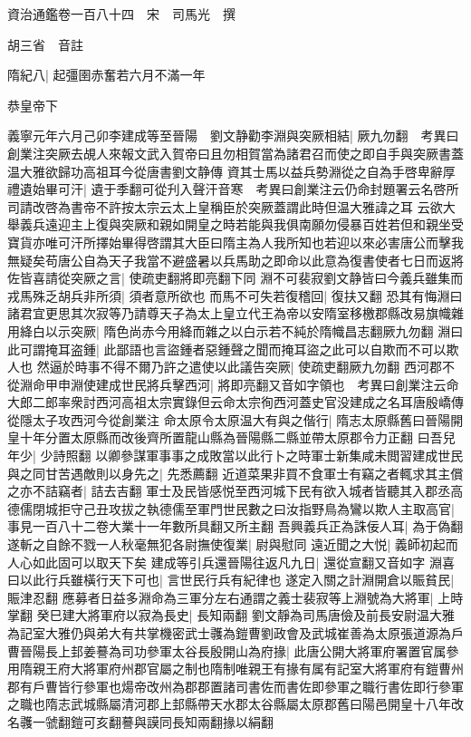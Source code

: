 資治通鑑卷一百八十四　宋　司馬光　撰

胡三省　音註

隋紀八|{
	起彊圉赤奮若六月不滿一年}


恭皇帝下

義寧元年六月己卯李建成等至晉陽　劉文静勸李淵與突厥相結|{
	厥九勿翻　考異曰創業注突厥去覘人來報文武入賀帝曰且勿相賀當為諸君召而使之即自手與突厥書蓋温大雅欲歸功高祖耳今從唐書劉文静傳}
資其士馬以益兵勢淵從之自為手啓卑辭厚禮遺始畢可汗|{
	遺于季翻可從刋入聲汗音寒　考異曰創業注云仍命封題署云名啓所司請改啓為書帝不許按太宗云太上皇稱臣於突厥蓋謂此時但温大雅諱之耳}
云欲大舉義兵遠迎主上復與突厥和親如開皇之時若能與我俱南願勿侵暴百姓若但和親坐受寶貨亦唯可汗所擇始畢得啓謂其大臣曰隋主為人我所知也若迎以來必害唐公而擊我無疑矣苟唐公自為天子我當不避盛暑以兵馬助之即命以此意為復書使者七日而返將佐皆喜請從突厥之言|{
	使疏吏翻將即亮翻下同}
淵不可裴寂劉文静皆曰今義兵雖集而戎馬殊乏胡兵非所須|{
	須者意所欲也}
而馬不可失若復稽回|{
	復扶又翻}
恐其有悔淵曰諸君宜更思其次寂等乃請尊天子為太上皇立代王為帝以安隋室移檄郡縣改易旗幟雜用絳白以示突厥|{
	隋色尚赤今用絳而雜之以白示若不純於隋幟昌志翻厥九勿翻}
淵曰此可謂掩耳盗鍾|{
	此鄙語也言盜鍾者惡鍾聲之聞而掩耳盜之此可以自欺而不可以欺人也}
然逼於時事不得不爾乃許之遣使以此議告突厥|{
	使疏吏翻厥九勿翻}
西河郡不從淵命甲申淵使建成世民將兵擊西河|{
	將即亮翻又音如字領也　考異曰創業注云命大郎二郎率衆討西河高祖太宗實錄但云命太宗徇西河蓋史官没建成之名耳唐殷嶠傳從隱太子攻西河今從創業注}
命太原令太原温大有與之偕行|{
	隋志太原縣舊曰晉陽開皇十年分置太原縣而改後齊所置龍山縣為晉陽縣二縣並帶太原郡令力正翻}
曰吾兒年少|{
	少詩照翻}
以卿參謀軍事事之成敗當以此行卜之時軍士新集咸未閲習建成世民與之同甘苦遇敵則以身先之|{
	先悉薦翻}
近道菜果非買不食軍士有竊之者輒求其主償之亦不詰竊者|{
	詰去吉翻}
軍士及民皆感悦至西河城下民有欲入城者皆聽其入郡丞高德儒閉城拒守己丑攻拔之執德儒至軍門世民數之曰汝指野鳥為鸞以欺人主取高官|{
	事見一百八十二卷大業十一年數所具翻又所主翻}
吾興義兵正為誅佞人耳|{
	為于偽翻}
遂斬之自餘不戮一人秋毫無犯各尉撫使復業|{
	尉與慰同}
遠近聞之大悦|{
	義師初起而人心如此固可以取天下矣}
建成等引兵還晉陽往返凡九日|{
	還從宣翻又音如字}
淵喜曰以此行兵雖橫行天下可也|{
	言世民行兵有紀律也}
遂定入關之計淵開倉以賑貧民|{
	賑津忍翻}
應募者日益多淵命為三軍分左右通謂之義士裴寂等上淵號為大將軍|{
	上時掌翻}
癸巳建大將軍府以寂為長史|{
	長知兩翻}
劉文靜為司馬唐儉及前長安尉温大雅為記室大雅仍與弟大有共掌機密武士彠為鎧曹劉政會及武城崔善為太原張道源為戶曹晉陽長上邽姜謩為司功參軍太谷長殷開山為府掾|{
	此唐公開大將軍府署置官属參用隋親王府大將軍府州郡官屬之制也隋制唯親王有掾有属有記室大將軍府有鎧曹州郡有戶曹皆行參軍也煬帝改州為郡郡置諸司書佐而書佐即參軍之職行書佐即行參軍之職也隋志武城縣屬清河郡上邽縣帶天水郡太谷縣屬太原郡舊曰陽邑開皇十八年改名彠一虢翻鎧可亥翻謩與謨同長知兩翻掾以絹翻}
